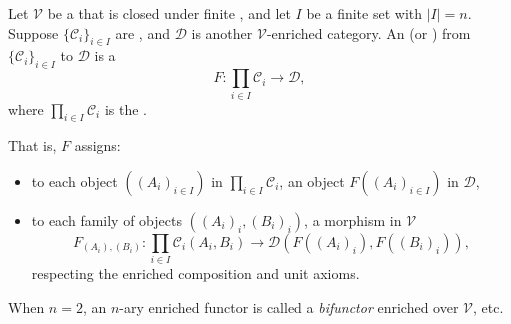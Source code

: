\begin{definition} \label{definition:n_ary_functor_of_categories_enriched_in_a_monoidal_category}
Let $\mathcal{V}$ be a  that is closed under finite , and let $I$ be a finite set with $|I|=n$. Suppose $\{\mathcal{C}_i\}_{i \in I}$ are , and $\mathcal{D}$ is another $\mathcal{V}$-enriched category. An  (or ) from $\{\mathcal{C}_i\}_{i\in I}$ to $\mathcal{D}$ is a 
$$F : \prod_{i \in I} \mathcal{C}_i \to \mathcal{D},$$
where $\prod_{i\in I} \mathcal{C}_i$ is the . 

That is, $F$ assigns:
\begin{itemize}
    \item to each object $((A_i)_{i \in I})$ in $\prod_{i \in I} \mathcal{C}_i$, an object $F((A_i)_{i \in I})$ in $\mathcal{D}$,
    \item to each family of objects $( (A_i)_i, (B_i)_i )$, a morphism in $\mathcal{V}$
    $$F_{(A_i),(B_i)} : \prod_{i\in I} \mathcal{C}_i(A_i,B_i) \to \mathcal{D}(F((A_i)_i), F((B_i)_i)),$$
    respecting the enriched composition and unit axioms.
\end{itemize}

When $n=2$, an $n$-ary enriched functor is called a \emph{bifunctor} enriched over $\mathcal{V}$, etc.

\end{definition}
